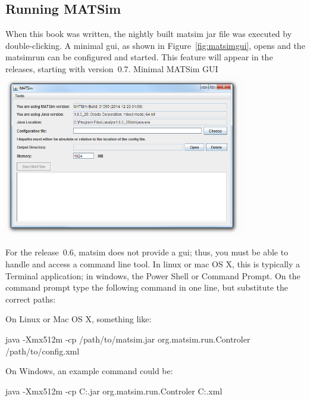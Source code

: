 \subsection{Running MATSim}
\label{sec:runexample}
When this book was written, the nightly built \gls{matsim} \gls{jar} file was executed by double-clicking. A minimal \gls{gui}, as shown in Figure~\ref{fig:matsimgui}, opens and the \gls{matsimrun} can be configured and started. 
This feature will appear in the releases, starting with version~0.7.
%
%
{Minimal MATSim GUI}%
{\label{fig:matsimgui}}%
{\includegraphics[width=0.8\textwidth, angle=0]{using/figures/matsimgui.png}}%
{}

For the release~0.6, \gls{matsim} does not provide a \gls{gui}; thus, you must be able to handle and access a command line tool.
%
In \gls{linux} or \gls{mac} OS X, this is typically a Terminal application; in \gls{windows}, the Power Shell or Command Prompt.
%
On the command prompt type the following command in one line, but substitute the correct paths: 

On Linux or Mac OS X, something like:
\begin{shell}
java -Xmx512m -cp /path/to/matsim.jar org.matsim.run.Controler /path/to/config.xml
\end{shell}


On Windows, an example command could be: 
\begin{shell}
java -Xmx512m -cp C:\MATSim\matsim.jar org.matsim.run.Controler
   C:\MATSim\config.xml
\end{shell}

